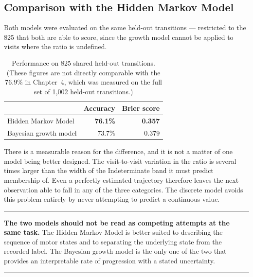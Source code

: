 \documentclass[11pt,a4paper]{article}
\newenvironment{keypoint}
  {\begin{center}\begin{minipage}{0.94\textwidth}%
   \vspace{4pt}\hrule\vspace{7pt}\small}
  {\vspace{7pt}\hrule\vspace{4pt}\end{minipage}\end{center}}
\begin{document}
\subsection{Comparison with the Hidden Markov Model}

Both models were evaluated on the same held-out transitions --- restricted to
the 825 that both are able to score, since the growth model cannot be applied to
visits where the ratio is undefined.

\begin{table}[H]
\centering
\begin{tabular}{@{}lrr@{}}
\toprule
 & \textbf{Accuracy} & \textbf{Brier score} \\
\midrule
Hidden Markov Model            & \textbf{76.1\%} & \textbf{0.357} \\
Bayesian growth model          & 73.7\%          & 0.379 \\
\bottomrule
\end{tabular}
\caption{Performance on 825 shared held-out transitions. (These figures are not
directly comparable with the 76.9\% in Chapter~4, which was measured on the full
set of 1{,}002 held-out transitions.)}
\end{table}

\noindent
There is a measurable reason for the difference, and it is not a matter of one
model being better designed. The visit-to-visit variation in the ratio is
several times larger than the width of the Indeterminate band it must predict
membership of. Even a perfectly estimated trajectory therefore leaves the next
observation able to fall in any of the three categories. The discrete model
avoids this problem entirely by never attempting to predict a continuous value.

\begin{keypoint}
\textbf{The two models should not be read as competing attempts at the same
task.} The Hidden Markov Model is better suited to describing the sequence of
motor states and to separating the underlying state from the recorded label. The
Bayesian growth model is the only one of the two that provides an interpretable
rate of progression with a stated uncertainty.
\end{keypoint}
\end{document}
